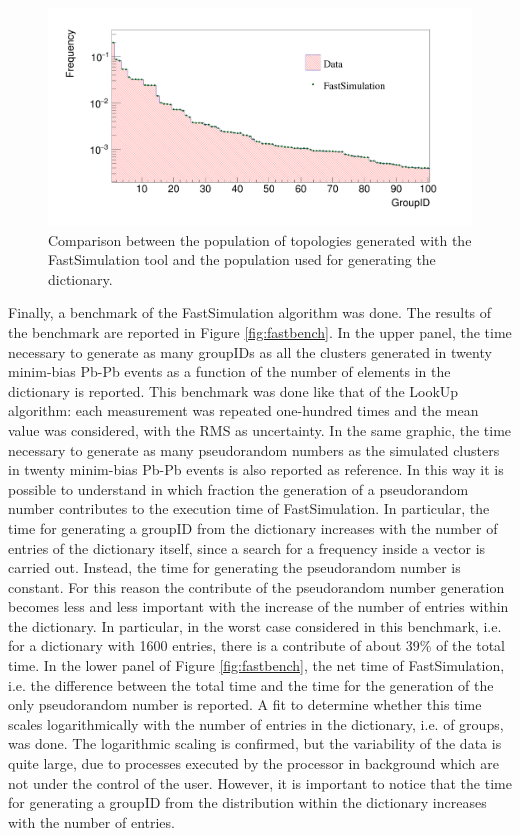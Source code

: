 \begin{figure}
  \centering
  \includegraphics[scale=0.2]{figures/fastcomp.png}
  \caption{Comparison between the population of topologies generated with the FastSimulation tool and the population used for generating the dictionary.}
  \label{fig:fastcomp}
\end{figure}
%
Finally, a benchmark of the FastSimulation algorithm was done. The results of the benchmark are reported in Figure \ref{fig:fastbench}. In the upper panel, the time necessary to generate as many groupIDs as all the clusters generated in twenty minim-bias Pb-Pb events as a function of the number of elements in the dictionary is reported. This benchmark was done like that of the LookUp algorithm: each measurement was repeated one-hundred times and the mean value was considered, with the RMS as uncertainty. In the same graphic, the time necessary to generate as many pseudorandom numbers as the simulated clusters in twenty minim-bias Pb-Pb events is also reported as reference. In this way it is possible to understand in which fraction the generation of a pseudorandom number contributes to the execution time of FastSimulation. In particular, the time for generating a groupID from the dictionary increases with the number of entries of the dictionary itself, since a search for a frequency inside a vector is carried out. Instead, the time for generating the pseudorandom number is constant. For this reason the contribute of the pseudorandom number generation becomes less and less important with the increase of the number of entries within the dictionary. In particular, in the worst case considered in this benchmark, i.e. for a dictionary with 1600 entries, there is a contribute of about 39\% of the total time. In the lower panel of Figure \ref{fig:fastbench}, the net time of FastSimulation, i.e. the difference between the total time and the time for the generation of the only pseudorandom number is reported. A fit to determine whether this time scales logarithmically with the number of entries in the dictionary, i.e. of groups, was done. The logarithmic scaling is confirmed, but the variability of the data is quite large, due to processes executed by the processor in background which are not under the control of the user. However, it is important to notice that the time for generating a groupID from the distribution within the dictionary increases with the number of entries.

